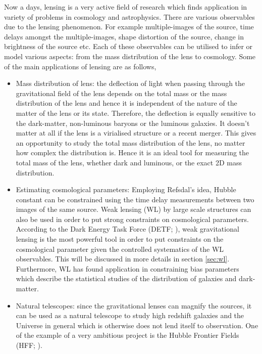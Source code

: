 Now a days, lensing is a very active field of research which finds application
in variety of problems in cosmology and astrophysics. 
There are various observables due to the lensing phenomenon. For example 
multiple-images of the source, time 
delays amongst the multiple-images, shape distortion of the source, change in brightness
of the source etc. Each of these observables can be utilised to infer or model various
aspects: from the mass distribution of the lens to cosmology. 
Some of the main applications of lensing are as follows,
\begin{itemize}
	\item Mass distribution of lens: the deflection of light when passing through
			the gravitational field of the lens depends on the total mass or the
			mass distribution of the lens and hence it is independent of the nature
			of the matter of the lens or its state. Therefore, the
			deflection is equally sensitive to the dark-matter, non-luminous baryons
			or the luminous galaxies. It doesn't matter at all if the lens is a 
			virialised structure or a recent merger. This gives an opportunity to 
			study the total mass distribution of the lens, no matter how complex 
			the distribution is. Hence it is an ideal tool for measuring the total mass
			of the lens, whether dark and luminous, or the exact 2D mass distribution. 

	\item Estimating cosmological parameters: Employing Refsdal's idea, Hubble constant
			can be constrained using the time delay measurements between two images
			of the same source. Weak lensing (WL) by large scale structures 
			can also be used in order to put
			strong constraints on cosmological parameters. According to the Dark 
			Energy Task Force (DETF; \cite{2006astro.ph..9591A}), weak gravitational lensing is the most powerful
			tool in order to put constraints on the cosmological parameter given
			the controlled systematics of the WL observables. This will be discussed
			in more details in section \ref{sec:wl}. Furthermore, WL has found application
			in constraining bias parameters which describe the statistical studies
			of the distribution of galaxies and dark-matter. 

	\item Natural telescopes: since the gravitational lenses can magnify the sources, it 
			can be used as a natural telescope to study high redshift galaxies and the Universe
			in general which is otherwise does not lend itself to observation. One of the example of a 
			very ambitious project is the Hubble Frontier Fields 
			(HFF; \cite{2014AAS...22325401L}). 
\end{itemize}


